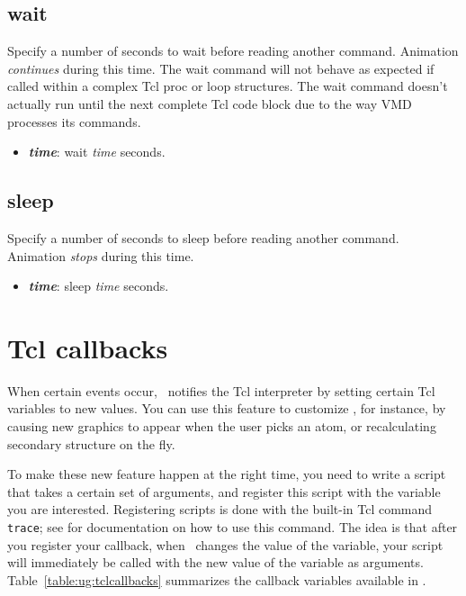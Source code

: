  \subsection{wait}
Specify a number of seconds to wait before reading another command.
Animation {\em continues} during this time.  The wait command will
not behave as expected if called within a complex Tcl proc or loop
structures.  The wait command doesn't actually run until the next complete
Tcl code block due to the way VMD processes its commands.  

  \begin{itemize}
    \item {\bf  {\it time}}: wait {\it time} seconds.
  \end{itemize}

  \subsection{sleep}
Specify a number of seconds to sleep before reading another command.
Animation {\em stops} during this time.

  \begin{itemize}
    \item {\bf  {\it time}}: sleep {\it time} seconds.
  \end{itemize}


\section{Tcl callbacks}

When certain events occur, \VMD\ notifies the Tcl interpreter by setting
certain Tcl variables to new values.  You can use this feature to customize
\VMD, for instance, by causing new graphics to appear when the user picks
an atom, or recalculating secondary structure on the fly.  

To make these new feature happen at the right time, you need to write a
script that takes a certain set of arguments, and register this script with
the variable you are interested.  Registering scripts is done with the
built-in Tcl command {\tt trace}; see 
for documentation on how to use this command.   The idea is that after you
register your callback, when \VMD\ changes the value of the variable, your
script will immediately be called with the new value of the variable as
arguments.  Table~\ref{table:ug:tclcallbacks} summarizes the callback
variables available in \VMD.

